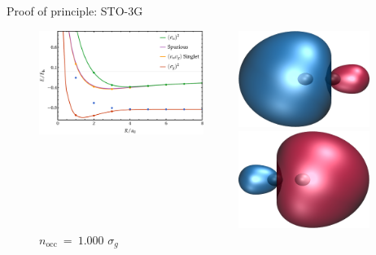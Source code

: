 \documentclass[10pt]{beamer}
\begin{document}
\begin{frame}{Proof of principle:  STO-3G}
\begin{figure}
\begin{columns}
      \begin{column}{0.68\textwidth}
        \includegraphics[width=0.9\textwidth]{Figures/fig_1b.pdf}
      \end{column}

      \begin{column}{0.15\textwidth}
        \includegraphics[width=0.9\textwidth]{Figures/H2_SB2_mo1.cube.png}
        \caption*{\centering $n_\text{occ}~=~1.000$
        $\sigma_u$}
        \includegraphics[width=0.9\textwidth]{Figures/H2_SB2_mo2.cube.png}
        \caption*{\centering $n_\text{occ}~=~1.000$
        $\sigma_g$}
      \end{column}
      

\end{columns}
\end{figure}
\end{frame}
\end{document}
